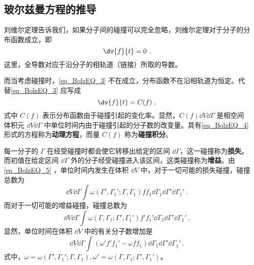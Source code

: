 \subsection{玻尔兹曼方程的推导}
 刘维尔定理告诉我们，如果分子间的碰撞可以完全忽略，刘维尔定理对于分子的分布函数成立，即
 \begin{equation}\label{eq_BolzEQ_3}
 \dv{f}{t}=0~.
 \end{equation}
 这里，全导数对应于沿分子的相轨道（链接）所取的导数。

 而当考虑碰撞时，\autoref{eq_BolzEQ_3} 不在成立，分布函数不在沿相轨道为恒定。代替\autoref{eq_BolzEQ_3} 应写成
 \begin{equation}\label{eq_BolzEQ_4}
 \dv{f}{t}=C(f)~,
 \end{equation}
 式中 $C(f)$ 表示分布函数由于碰撞引起的变化率。显然，$C(f)\dd V\dd\Gamma$ 是相空间体积元 $\dd V\dd\Gamma$ 中单位时间内由于碰撞引起的分子数的改变量。具有\autoref{eq_BolzEQ_4} 形式的方程称为\textbf{动理方程}，而量 $C(f)$ 称为\textbf{碰撞积分}。

 每一分子的 $\Gamma$ 在经受碰撞时都会使它转移出给定的区间 $\dd\Gamma$，这一碰撞称为\textbf{损失}。而初值在给定区间 $\dd \Gamma$ 外的分子经受碰撞进入该区间，这类碰撞称为\textbf{增益}。由\autoref{eq_BolzEQ_5} ，单位时间内发生在体积 $\dd V$ 中，对于一切可能的损失碰撞，碰撞总数为
 \begin{equation}
 \dd V\dd \Gamma\int\omega(\Gamma',\Gamma_1';\Gamma,\Gamma_1)ff_1\dd\Gamma_1\dd\Gamma'\dd\Gamma_1'~.
 \end{equation}
  而对于一切可能的增益碰撞，碰撞总数为
  \begin{equation}
  \dd V\dd \Gamma\int\omega(\Gamma,\Gamma_1;\Gamma',\Gamma_1')f'f_1'\dd\Gamma_1\dd\Gamma'\dd\Gamma_1'~.
  \end{equation}
  显然，单位时间在体积 $\dd V$ 中的有关分子数增加是
  \begin{equation}\label{eq_BolzEQ_6}
  \dd V\dd \Gamma\int(\omega'f'f_1'-\omega f f_1)\dd\Gamma_1\dd\Gamma'\dd\Gamma_1'~.
  \end{equation}
  式中，$\omega=\omega(\Gamma',\Gamma_1';\Gamma,\Gamma_1),\omega'=\omega(\Gamma,\Gamma_1;\Gamma',\Gamma_1')$。

